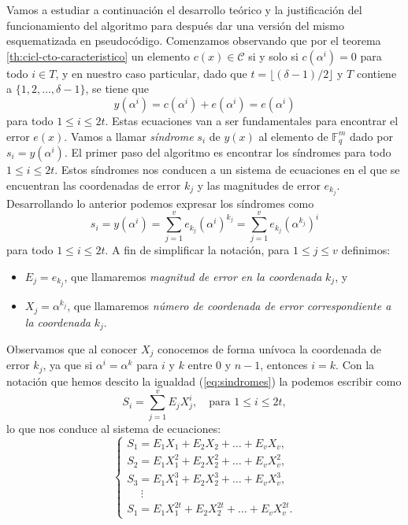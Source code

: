 Vamos a estudiar a continuación el desarrollo teórico y la justificación del funcionamiento del algoritmo para después dar una versión del mismo esquematizada en pseudocódigo.
Comenzamos observando que por el teorema \ref{th:cicl-cto-caracteristico} un elemento \(c(x) \in \mathcal C\) si y solo si \(c(\alpha^i) = 0\) para todo \(i \in T\), y en nuestro caso particular, dado que \(t = \lfloor (\delta - 1)/2 \rfloor\) y \(T\) contiene a \(\{1, 2, \dots, \delta - 1\}\), se tiene que
\[
  y(\alpha^i) = c(\alpha^i) + e(\alpha^i) = e(\alpha^i)
\]
para todo \(1 \leq i \leq 2t\).
Estas ecuaciones van a ser fundamentales para encontrar el error \(e(x)\).
Vamos a llamar \textit{síndrome} \(s_i\) de \(y(x)\) al elemento de \(\mathbb F_{q}^m\) dado por \(s_i = y(\alpha^i)\).
El primer paso del algoritmo es encontrar los síndromes para todo \(1 \leq i \leq 2t\).
Estos síndromes nos conducen a un sistema de ecuaciones en el que se encuentran las coordenadas de error \(k_j\) y las magnitudes de error \(e_{k_j}\).
Desarrollando lo anterior podemos expresar los síndromes como
\begin{equation}
  \label{eq:sindromes}
  s_i = y(\alpha^i) = \sum_{j = 1}^v e_{k_j}(\alpha^i)^{k_j}
   = \sum_{j = 1}^v e_{k_j}(\alpha^{k_j})^i
\end{equation}
para todo \(1 \leq i \leq 2t\).
A fin de simplificar la notación, para \(1 \leq j \leq v\) definimos: \begin{itemize}[label={—}, noitemsep, leftmargin=*]
  \item \(E_j = e_{k_j}\), que llamaremos \textit{magnitud de error en la coordenada} \(k_j\), y
  \item \(X_j = \alpha^{k_j}\), que llamaremos \textit{número de coordenada de error correspondiente a la coordenada} \(k_j\).
\end{itemize}
Observamos que al conocer \(X_j\) conocemos de forma unívoca la coordenada de error \(k_j\), ya que si \(\alpha^i = \alpha^k\) para \(i\) y \(k\) entre \(0\) y \(n-1\), entonces \(i = k\).
Con la notación que hemos descito la igualdad (\ref{eq:sindromes}) la podemos escribir como \begin{equation}
  \label{eq:sindromes-alt}
  S_i = \sum_{j = 1}^v E_jX_{j}^i, \quad\text{para } 1 \leq i \leq 2t,
\end{equation}
lo que nos conduce al sistema de ecuaciones: \begin{equation}
  \begin{cases}
    S_1 = E_1X_1 + E_2X_2 + \dots + E_vX_v,\\
    S_2 = E_1X_1^2 + E_2X_2^2 + \dots + E_vX_v^2,\\
    S_3 = E_1X_1^3 + E_2X_2^3 + \dots + E_vX_v^3,\\
    \quad\;\vdots\\
    S_1 = E_1X_1^{2t} + E_2X_2^{2t} + \dots + E_vX_v^{2t}.
  \end{cases}
  \label{eq:sindromes-alt-sistema}
\end{equation}
